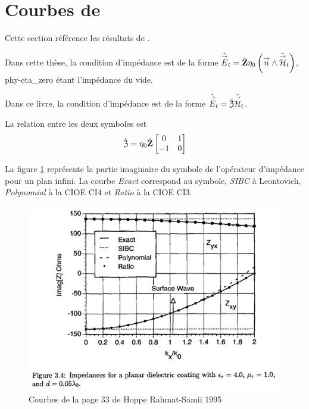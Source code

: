 \section{Courbes de \cite{hoppe_impedance_1995}}

Cette section référence les résultats de \cite{hoppe_impedance_1995}. 

Dans cette thèse, la condition d'impédance est de la forme \(\hat{{\overset{\rightarrow}{E}}}_t = \hat{\mathbf{Z}} \eta_0\left({\overset{\rightarrow}{n}} \wedge \hat{{\overset{\rightarrow}{\mathcal{H}}}}_t\right)\), \gls{phy-eta_zero} étant l'impédance du vide.

Dans ce livre, la condition d'impédance est de la forme \(\hat{{\overset{\rightarrow}{E}}}_t = \hat{\mathfrak{Z}} \hat{{\overset{\rightarrow}{\mathcal{H}}}}_t\).

La relation entre les deux symboles est
\begin{equation}
  \hat{\mathfrak{Z}} = \eta_0\hat{\mathbf{Z}}\begin{bmatrix}0&1\\-1&0\end{bmatrix}
\end{equation}

La figure \ref{fig:annex:hoppe:p33} représente la partie imaginaire du symbole de l'opérateur d'impédance pour un plan infini. La courbe \textit{Exact} correspond au symbole, \textit{SIBC} à Leontovich, \textit{Polynomial} à la CIOE CI4 et \textit{Ratio} à la CIOE CI3.

\begin{figure}[h!tb]
    \includegraphics[width=0.99\textwidth]{images/hoppe/p33_imp_cylindre.png}
    \caption{Courbes de la page 33 de Hoppe Rahmat-Samii 1995}
    \label{fig:annex:hoppe:p33}
\end{figure}


